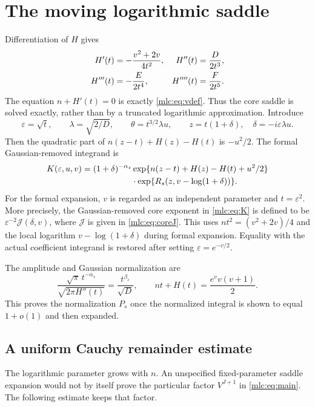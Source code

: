 \documentclass[11pt]{article}
\theoremstyle{remark}\newtheorem{remark}[theorem]{Remark}
\newcommand{\eps}{\varepsilon}
\begin{document}
\section{The moving logarithmic saddle}\label{mlc:sec:saddle}
Differentiation of $H$ gives
\begin{align}
 H'(t)&=-\frac{v^2+2v}{4t^2},&
 H''(t)&=\frac D{2t^3},\label{mlc:eq:Hderiv}\\
 H'''(t)&=-\frac E{2t^4},&
 H''''(t)&=\frac F{2t^5}.\notag
\end{align}
The equation $n+H'(t)=0$ is exactly \eqref{mlc:eq:vdef}. Thus the core saddle is solved exactly, rather than by a truncated logarithmic approximation. Introduce
\begin{equation}\label{mlc:eq:gaussiancoords}
 \eps=\sqrt t,\qquad \lambda=\sqrt{2/D},\qquad
 \theta=t^{3/2}\lambda u,\qquad z=t(1+\delta),\quad
 \delta=-i\eps\lambda u.
\end{equation}
Then the quadratic part of $n(z-t)+H(z)-H(t)$ is $-u^2/2$. The formal Gaussian-removed integrand is
\begin{align}
 K(\eps,u,v)={}&(1+\delta)^{-\alpha_s}
  \exp\{n(z-t)+H(z)-H(t)+u^2/2\}\notag\\
 &\hspace{16mm}\cdot\exp\{R_s(z,v-\log(1+\delta))\}.
 \label{mlc:eq:K}
\end{align}
For the formal expansion, $v$ is regarded as an independent parameter and $t=\eps^2$. More precisely, the Gaussian-removed core exponent in \eqref{mlc:eq:K} is defined to be $\eps^{-2}\mathcal J(\delta,v)$, where $\mathcal J$ is given in \eqref{mlc:eq:coreJ}. This uses $nt^2=(v^2+2v)/4$ and the local logarithm $v-\log(1+\delta)$ during formal expansion. Equality with the actual coefficient integrand is restored after setting $\eps=e^{-v/2}$.

The amplitude and Gaussian normalization are
\begin{equation}\label{mlc:eq:prefactor}
 \frac{\sqrt\pi\,t^{-\alpha_s}}{\sqrt{2\pi H''(t)}}
   =\frac{t^{\beta_s}}{\sqrt D},\qquad
 nt+H(t)=\frac{e^v v(v+1)}2.
\end{equation}
This proves the normalization $P_s$ once the normalized integral is shown to equal $1+o(1)$ and then expanded.

\subsection{A uniform Cauchy remainder estimate}\label{mlc:subsec:remainder}
The logarithmic parameter grows with $n$. An unspecified fixed-parameter saddle expansion would not by itself prove the particular factor $V^{J+1}$ in \eqref{mlc:eq:main}. The following estimate keeps that factor.
\end{document}
